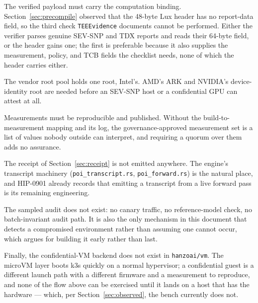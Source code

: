 \documentclass[11pt]{article}
\newcommand{\code}[1]{\texttt{#1}}
\begin{document}
The verified payload must carry the computation binding. Section~\ref{sec:precompile} observed that
the 48-byte Lux header has no report-data field, so the third check \code{TEEEvidence} documents
cannot be performed. Either the verifier parses genuine SEV-SNP and TDX reports and reads their
64-byte field, or the header gains one; the first is preferable because it also supplies the
measurement, policy, and TCB fields the checklist needs, none of which the header carries either.

The vendor root pool holds one root, Intel's. AMD's ARK and NVIDIA's device-identity root are needed
before an SEV-SNP host or a confidential GPU can attest at all.

Measurements must be reproducible and published. Without the build-to-measurement mapping and its
log, the governance-approved measurement set is a list of values nobody outside can interpret, and
requiring a quorum over them adds no assurance.

The receipt of Section~\ref{sec:receipt} is not emitted anywhere. The engine's transcript machinery
(\code{poi\_transcript.rs}, \code{poi\_forward.rs}) is the natural place, and HIP-0901 already
records that emitting a transcript from a live forward pass is its remaining engineering.

The sampled audit does not exist: no canary traffic, no reference-model check, no batch-invariant
audit path. It is also the only mechanism in this document that detects a compromised environment
rather than assuming one cannot occur, which argues for building it early rather than last.

Finally, the confidential-VM backend does not exist in \code{hanzoai/vm}. The microVM layer boots
k3s quickly on a normal hypervisor; a confidential guest is a different launch path with a different
firmware and a measurement to reproduce, and none of the flow above can be exercised until it lands
on a host that has the hardware --- which, per Section~\ref{sec:observed}, the bench currently does
not.
\end{document}
